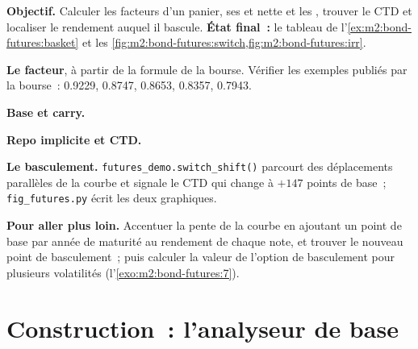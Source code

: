 \begin{tutorial}
\textbf{Objectif.} Calculer les facteurs d'un panier, ses  et nette et
les , trouver le CTD et localiser le rendement auquel il bascule.
\textbf{État final~:} le tableau de l'\cref{ex:m2:bond-futures:basket} et
les \cref{fig:m2:bond-futures:switch,fig:m2:bond-futures:irr}.
\begin{tutsteps}
\item \textbf{Le facteur}, à partir de la formule de la bourse.
\label{lst:m2:bond-futures:cf}
Vérifier les exemples publiés par la bourse~: 0.9229, 0.8747, 0.8653, 0.8357, 0.7943.
\item \textbf{Base et carry.}
\label{lst:m2:bond-futures:basis}
\item \textbf{Repo implicite et CTD.}
\label{lst:m2:bond-futures:irr}
\item \textbf{Le basculement.} \texttt{futures\_demo.switch\_shift()} parcourt
des déplacements parallèles de la courbe et signale le CTD qui change à $+147$ points de base~;
\texttt{fig\_futures.py} écrit les deux graphiques.
\end{tutsteps}
\textbf{Pour aller plus loin.} Accentuer la pente de la courbe en ajoutant un point de base par
année de maturité au rendement de chaque note, et trouver le nouveau point de basculement~;
puis calculer la valeur de l'option de basculement pour plusieurs volatilités
(l'\cref{exo:m2:bond-futures:7}).
\end{tutorial}

\section{Construction~: l'analyseur de base}\label{bld:m2:bond-futures:ctd}

